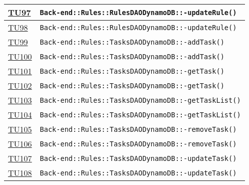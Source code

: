 \begin{longtable}{|>{\centering}m{1cm}|m{12cm}<{\centering}|}
\hyperlink{TU97}{TU97} & \texttt{Back-end::Rules::RulesDAODynamoDB::-\linebreak updateRule()}\\ \hline

\hyperlink{TU98}{TU98} & \texttt{Back-end::Rules::RulesDAODynamoDB::-\linebreak updateRule()}\\ \hline

\hyperlink{TU99}{TU99} & \texttt{Back-end::Rules::TasksDAODynamoDB::-\linebreak addTask()}\\ \hline

\hyperlink{TU100}{TU100} & \texttt{Back-end::Rules::TasksDAODynamoDB::-\linebreak addTask()}\\ \hline

\hyperlink{TU101}{TU101} & \texttt{Back-end::Rules::TasksDAODynamoDB::-\linebreak getTask()}\\ \hline

\hyperlink{TU102}{TU102} & \texttt{Back-end::Rules::TasksDAODynamoDB::-\linebreak getTask()}\\ \hline

\hyperlink{TU103}{TU103} & \texttt{Back-end::Rules::TasksDAODynamoDB::-\linebreak getTaskList()}\\ \hline

\hyperlink{TU104}{TU104} & \texttt{Back-end::Rules::TasksDAODynamoDB::-\linebreak getTaskList()}\\ \hline

\hyperlink{TU105}{TU105} & \texttt{Back-end::Rules::TasksDAODynamoDB::-\linebreak removeTask()}\\ \hline

\hyperlink{TU106}{TU106} & \texttt{Back-end::Rules::TasksDAODynamoDB::-\linebreak removeTask()}\\ \hline

\hyperlink{TU107}{TU107} & \texttt{Back-end::Rules::TasksDAODynamoDB::-\linebreak updateTask()}\\ \hline

\hyperlink{TU108}{TU108} & \texttt{Back-end::Rules::TasksDAODynamoDB::-\linebreak updateTask()}\\ \hline


\end{longtable}
